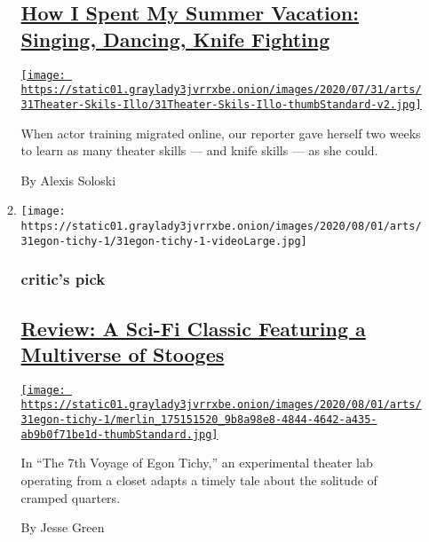 \begin{enumerate}
\begin{enumerate}
    \hypertarget{how-i-spent-my-summer-vacation-singing-dancing-knife-fighting}{%
    \subsection{\texorpdfstring{\href{/2020/07/30/theater/theater-classes-at-home.html}{How
    I Spent My Summer Vacation: Singing, Dancing, Knife
    Fighting}}{How I Spent My Summer Vacation: Singing, Dancing, Knife Fighting}}\label{how-i-spent-my-summer-vacation-singing-dancing-knife-fighting}}

    \href{/2020/07/30/theater/theater-classes-at-home.html}{\texttt{[image: https://static01.graylady3jvrrxbe.onion/images/2020/07/31/arts/31Theater-Skils-Illo/31Theater-Skils-Illo-thumbStandard-v2.jpg]}}

    When actor training migrated online, our reporter gave herself two
    weeks to learn as many theater skills --- and knife skills --- as
    she could.

    By Alexis Soloski
  \item
    \texttt{[image: https://static01.graylady3jvrrxbe.onion/images/2020/08/01/arts/31egon-tichy-1/31egon-tichy-1-videoLarge.jpg]}

    \hypertarget{critics-pick}{%
    \subsubsection{critic's pick}\label{critics-pick}}

    \hypertarget{review-a-sci-fi-classic-featuring-a-multiverse-of-stooges}{%
    \subsection{\texorpdfstring{\href{/2020/07/31/theater/the-7th-voyage-of-egon-tichy-review.html}{Review:
    A Sci-Fi Classic Featuring a Multiverse of
    Stooges}}{Review: A Sci-Fi Classic Featuring a Multiverse of Stooges}}\label{review-a-sci-fi-classic-featuring-a-multiverse-of-stooges}}

    \href{/2020/07/31/theater/the-7th-voyage-of-egon-tichy-review.html}{\texttt{[image: https://static01.graylady3jvrrxbe.onion/images/2020/08/01/arts/31egon-tichy-1/merlin\_175151520\_9b8a98e8-4844-4642-a435-ab9b0f71be1d-thumbStandard.jpg]}}

    In ``The 7th Voyage of Egon Tichy,'' an experimental theater lab
    operating from a closet adapts a timely tale about the solitude of
    cramped quarters.

    By Jesse Green
  \end{enumerate}
\end{enumerate}

